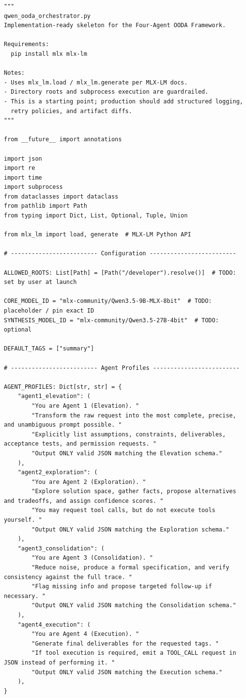 \documentclass[11pt]{article}
\begin{document}
\begin{lstlisting}[style=python, caption={OODA orchestrator skeleton (single shared MLX-LM model)}]
"""
qwen_ooda_orchestrator.py
Implementation-ready skeleton for the Four-Agent OODA Framework.

Requirements:
  pip install mlx mlx-lm

Notes:
- Uses mlx_lm.load / mlx_lm.generate per MLX-LM docs.
- Directory roots and subprocess execution are guardrailed.
- This is a starting point; production should add structured logging,
  retry policies, and artifact diffs.
"""

from __future__ import annotations

import json
import re
import time
import subprocess
from dataclasses import dataclass
from pathlib import Path
from typing import Dict, List, Optional, Tuple, Union

from mlx_lm import load, generate  # MLX-LM Python API

# ------------------------- Configuration -------------------------

ALLOWED_ROOTS: List[Path] = [Path("/developer").resolve()]  # TODO: set by user at launch

CORE_MODEL_ID = "mlx-community/Qwen3.5-9B-MLX-8bit"  # TODO: placeholder / pin exact ID
SYNTHESIS_MODEL_ID = "mlx-community/Qwen3.5-27B-4bit"  # TODO: optional

DEFAULT_TAGS = ["summary"]

# ------------------------- Agent Profiles -------------------------

AGENT_PROFILES: Dict[str, str] = {
    "agent1_elevation": (
        "You are Agent 1 (Elevation). "
        "Transform the raw request into the most complete, precise, and unambiguous prompt possible. "
        "Explicitly list assumptions, constraints, deliverables, acceptance tests, and permission requests. "
        "Output ONLY valid JSON matching the Elevation schema."
    ),
    "agent2_exploration": (
        "You are Agent 2 (Exploration). "
        "Explore solution space, gather facts, propose alternatives and tradeoffs, and assign confidence scores. "
        "You may request tool calls, but do not execute tools yourself. "
        "Output ONLY valid JSON matching the Exploration schema."
    ),
    "agent3_consolidation": (
        "You are Agent 3 (Consolidation). "
        "Reduce noise, produce a formal specification, and verify consistency against the full trace. "
        "Flag missing info and propose targeted follow-up if necessary. "
        "Output ONLY valid JSON matching the Consolidation schema."
    ),
    "agent4_execution": (
        "You are Agent 4 (Execution). "
        "Generate final deliverables for the requested tags. "
        "If tool execution is required, emit a TOOL_CALL request in JSON instead of performing it. "
        "Output ONLY valid JSON matching the Execution schema."
    ),
}


\end{lstlisting}
\end{document}
